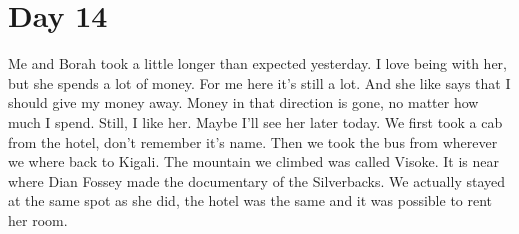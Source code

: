 \section{Day 14}
Me and Borah took a little longer than expected yesterday.
I love being with her, but she spends a lot of money.
For me here it's still a lot. And she like says that I should give my money away.
Money in that direction is gone, no matter how much I spend.
Still, I like her. 
Maybe I'll see her later today.
We first took a cab from the hotel, don't remember it's name.
Then we took the bus from wherever we where back to Kigali.
The mountain we climbed was called Visoke. It is near where Dian Fossey made the documentary of the Silverbacks. We actually stayed at the same spot as she did, the hotel was the same and it was possible to rent her room.
